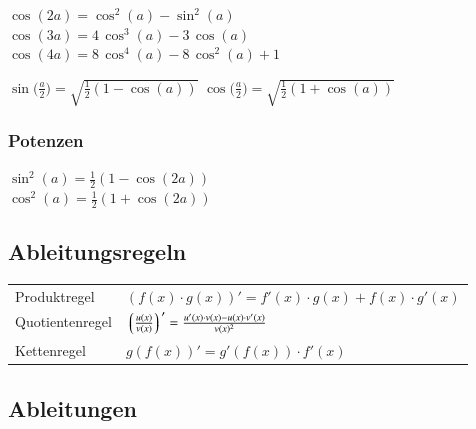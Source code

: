$\cos(2a) = \cos^2(a) - \sin^2(a)$ \\
$\cos(3a) = 4 \, \cos^3(a) -3 \, \cos(a)$ \\ 
$\cos(4a) = 8 \, \cos^4(a) - 8 \, \cos^2(a) + 1$

$\sin \big( \frac{a}{2} \big) = \sqrt{\frac{1}{2}(1-\cos(a))} $ \qquad $\cos \big( \frac{a}{2} \big) = \sqrt{\frac{1}{2}(1+\cos(a))} $ 


\subsubsection{Potenzen}
$\sin^2(a) = \frac{1}{2}(1-\cos(2a))$\\
$\cos^2(a) = \frac{1}{2}(1+\cos(2a))$



\subsection{Ableitungsregeln}
\renewcommand{\arraystretch}{1.5}
\begin{tabular}{ll}
    Produktregel    & $ (f(x) \cdot g(x))' = f'(x) \cdot g(x) + f(x) \cdot g'(x) $ \\
    Quotientenregel & $ \left\lgroup \frac{u(x)}{v(x)} \right\rgroup  ' = \frac{u'(x) \cdot v(x) - u(x) \cdot v'(x)}{v(x) ^2}$ \\
    Kettenregel     & $ g(f(x))' =  g'(f(x)) \cdot f'(x)$
\end{tabular}
\renewcommand{\arraystretch}{1}


\subsection{Ableitungen}

